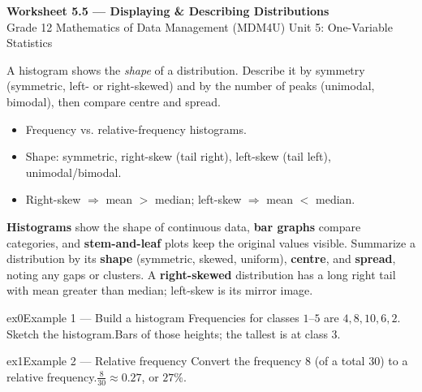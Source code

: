 \documentclass[11pt]{article}
\begin{document}
\begin{center}
{\LARGE\bfseries\color{titleblue}Worksheet 5.5 --- Displaying \& Describing Distributions}\\[2pt]
{\small Grade 12 Mathematics of Data Management (MDM4U) \textperiodcentered{} Unit 5: One-Variable Statistics}
\end{center}

\begin{ideabox}
A histogram shows the \emph{shape} of a distribution. Describe it by symmetry (symmetric, left- or right-skewed) and by the number of peaks (unimodal, bimodal), then compare centre and spread.
\begin{itemize}[leftmargin=*,itemsep=2pt]
  \item Frequency vs. relative-frequency histograms.
  \item Shape: symmetric, right-skew (tail right), left-skew (tail left), unimodal/bimodal.
  \item Right-skew $\Rightarrow$ mean $>$ median; left-skew $\Rightarrow$ mean $<$ median.
\end{itemize}
\end{ideabox}

\begin{learnbox}
\textbf{Histograms} show the shape of continuous data, \textbf{bar graphs} compare categories, and \textbf{stem-and-leaf} plots keep the original values visible.
Summarize a distribution by its \textbf{shape} (symmetric, skewed, uniform), \textbf{centre}, and \textbf{spread}, noting any gaps or clusters.
A \textbf{right-skewed} distribution has a long right tail with mean greater than median; left-skew is its mirror image.
\end{learnbox}


\begin{example}{ex0}{Example 1 --- Build a histogram}
Frequencies for classes $1$--$5$ are $4,8,10,6,2$. Sketch the histogram.\soln Bars of those heights; the tallest is at class $3$.
\end{example}

\begin{example}{ex1}{Example 2 --- Relative frequency}
Convert the frequency $8$ (of a total $30$) to a relative frequency.\soln $\tfrac{8}{30}\approx0.27$, or $27\%$.
\end{example}
\end{document}

